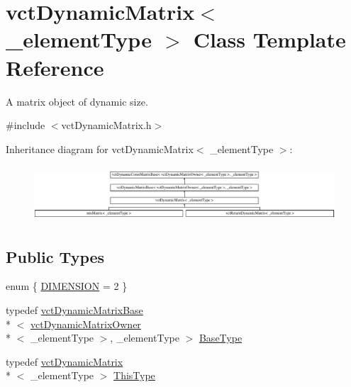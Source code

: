 \hypertarget{classvct_dynamic_matrix}{\section{vct\-Dynamic\-Matrix$<$ \-\_\-element\-Type $>$ Class Template Reference}
\label{classvct_dynamic_matrix}
}


A matrix object of dynamic size.  




{\ttfamily \#include $<$vct\-Dynamic\-Matrix.\-h$>$}

Inheritance diagram for vct\-Dynamic\-Matrix$<$ \-\_\-element\-Type $>$\-:\begin{figure}[H]
\begin{center}
\leavevmode
\includegraphics[height=2.101313cm]{dd/d81/classvct_dynamic_matrix}
\end{center}
\end{figure}
\subsection*{Public Types}
\begin{DoxyCompactItemize}
\item 
enum \{ \hyperlink{classvct_dynamic_matrix_a20a06ac370f39d094a3249a08644471aa6b17aeb32aa45c3a75bad3506c9218dc}{D\-I\-M\-E\-N\-S\-I\-O\-N} = 2
 \}
\item 
typedef \hyperlink{classvct_dynamic_matrix_base}{vct\-Dynamic\-Matrix\-Base}\\*
$<$ \hyperlink{classvct_dynamic_matrix_owner}{vct\-Dynamic\-Matrix\-Owner}\\*
$<$ \-\_\-element\-Type $>$, \-\_\-element\-Type $>$ \hyperlink{classvct_dynamic_matrix_a80b366a0b1c03c7a5453e76aea1fbe83}{Base\-Type}
\item 
typedef \hyperlink{classvct_dynamic_matrix}{vct\-Dynamic\-Matrix}\\*
$<$ \-\_\-element\-Type $>$ \hyperlink{classvct_dynamic_matrix_a49440a1600af9e5cbce01b74a66434bd}{This\-Type}
\end{DoxyCompactItemize}
